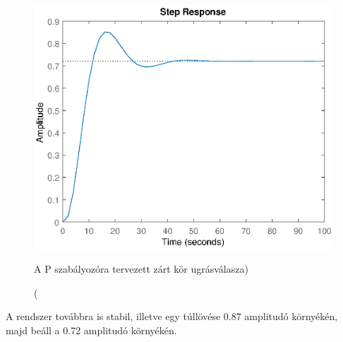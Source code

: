 \documentclass[12pt]{article}
\begin{document}
\begin{figure}[H]
\centering
\includegraphics[scale=.70]{WPLANTPCLMR}
\caption(A P szabályozóra tervezett zárt kör ugrásválasza)
\end{figure}
A rendszer továbbra is stabil, illetve egy túllövése 0.87 amplitudó környékén, majd beáll a 0.72 amplitudó környékén. 
\end{document}
